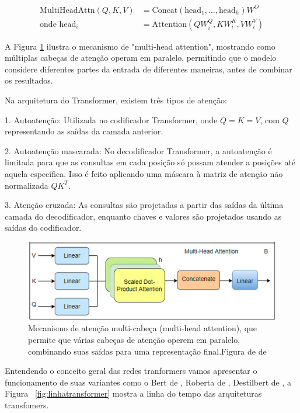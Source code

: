 \begin{equation}
\begin{aligned}
\text{MultiHeadAttn}(Q, K, V) &= \text{Concat}(\text{head}_1, \ldots, \text{head}_h)W^O \\
\text{onde } \text{head}_i &= \text{Attention}(QW_i^{Q}, KW_i^{K}, VW_i^{V})
\label{eq:MultAttention}
\end{aligned}
\end{equation}

A Figura \ref{fig:enter-label} ilustra o mecanismo de "multi-head attention", mostrando como múltiplas cabeças de atenção operam em paralelo, permitindo que o modelo considere diferentes partes da entrada de diferentes maneiras, antes de combinar os resultados.

Na arquitetura do Transformer, existem três tipos de atenção:

1. Autoatenção: Utilizada no codificador Transformer, onde \(Q = K = V\), com \(Q\) representando as saídas da camada anterior.
   
2. Autoatenção mascarada: No decodificador Transformer, a autoatenção é limitada para que as consultas em cada posição só possam atender a posições até aquela específica. Isso é feito aplicando uma máscara à matriz de atenção não normalizada \(QK^T\).

3. Atenção cruzada: As consultas são projetadas a partir das saídas da última camada do decodificador, enquanto chaves e valores são projetados usando as saídas do codificador.

\begin{figure}
    \centering
    \includegraphics[width=1.0\linewidth]{capitulos//figuras/multi-head.png}
    \caption{Mecanismo de atenção multi-cabeça (multi-head attention), que permite que várias cabeças de atenção operem em paralelo, combinando suas saídas para uma representação final.Figura de de \textcite{THIRUNAVUKARASU2024100648}}
    \label{fig:enter-label}
\end{figure}

Entendendo o conceito geral das redes tranformers vamos apresentar o funcionamento de suas variantes como o Bert de \textcite{Develin}, Roberta de \textcite{Roberta}, Destilbert de \textcite{https://doi.org/10.48550/arxiv.1910.01108}, a Figura ~\ref{fig:linhatransformer} mostra a linha do tempo das arquiteturas transfomers.

